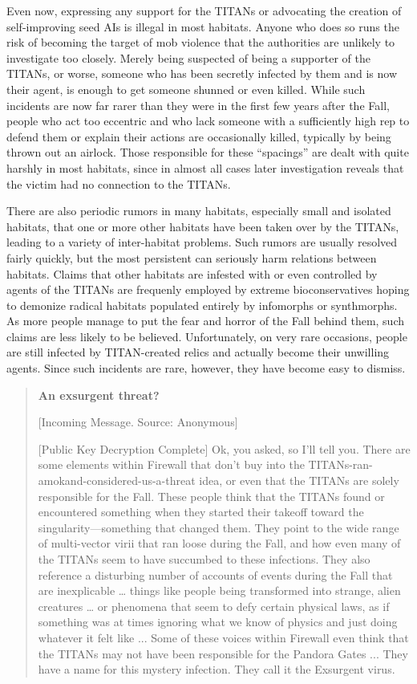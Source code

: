 Even now, expressing any support for the TITANs or advocating the creation of self-improving seed AIs is illegal in most habitats. Anyone who does so runs the risk of becoming the target of mob violence that the authorities are unlikely to investigate too closely. Merely being suspected of being a supporter of the TITANs, or worse, someone who has been secretly infected by them and is now their agent, is enough to get someone shunned or even killed. While such incidents are now far rarer than they were in the first few years after the Fall, people who act too eccentric and who lack someone with a sufficiently high rep to defend them or explain their actions are occasionally killed, typically by being thrown out an airlock. Those responsible for these “spacings” are dealt with quite harshly in most habitats, since in almost all cases later investigation reveals that the victim had no connection to the TITANs. 

There are also periodic rumors in many habitats, especially small and isolated habitats, that one or more other habitats have been taken over by the TITANs, leading to a variety of inter-habitat problems. Such rumors are usually resolved fairly quickly, but the most persistent can seriously harm relations between habitats. Claims that other habitats are infested with or even controlled by agents of the TITANs are frequenly employed by extreme bioconservatives hoping to demonize radical habitats populated entirely by infomorphs or synthmorphs. As more people manage to put the fear and horror of the Fall behind them, such claims are less likely to be believed. Unfortunately, on very rare occasions, people are still infected by TITAN-created relics and actually become their unwilling agents. Since such incidents are rare, however, they have become easy to dismiss. 

\begin{quotation}
\textbf{An exsurgent threat?} 

 [Incoming Message. Source: Anonymous] 

 [Public Key Decryption Complete]  Ok, you asked, so I’ll tell you. There are some elements within Firewall that don’t buy into the TITANs-ran-amokand-considered-us-a-threat idea, or even that the TITANs are solely responsible for the Fall. These people think that the TITANs found or encountered something when they started their takeoff toward the singularity—something that changed them. They point to the wide range of multi-vector virii that ran loose during the Fall, and how even many of the TITANs seem to have succumbed to these infections. They also reference a disturbing number of accounts of events during the Fall that are inexplicable … things like people being transformed into strange, alien creatures … or phenomena that seem to defy certain physical laws, as if something was at times ignoring what we know of physics and just doing whatever it felt like ... Some of these voices within Firewall even think that the TITANs may not have been responsible for the Pandora Gates ... They have a name for this mystery infection. They call it the Exsurgent virus.
\end{quotation} 

